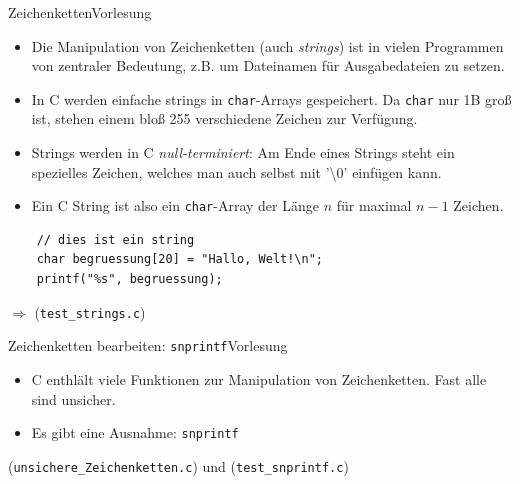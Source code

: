 \documentclass[xcolor=dvipsnames]{beamer}
\newcounter{lecturecounter}
\begin{document}
\begin{frame}[fragile]{Zeichenketten}{Vorlesung }
  \begin{block}{}
    \begin{itemize}
      \item{Die Manipulation von Zeichenketten (auch \emph{strings}) ist in vielen Programmen von zentraler Bedeutung, z.B. um Dateinamen für Ausgabedateien zu setzen.}
      \item{In C werden einfache strings in \texttt{char}-Arrays gespeichert. Da \texttt{char} nur 1B groß ist, stehen einem bloß 255 verschiedene Zeichen zur Verfügung.}
      \item{Strings werden in C \emph{null-terminiert}: Am Ende eines Strings steht ein spezielles Zeichen, welches man auch selbst mit '\textbackslash 0' einfügen kann.}
      \item{Ein C String ist also ein \texttt{char}-Array der Länge $n$ für maximal $n-1$ Zeichen.}
    \end{itemize}
  \end{block}
  \begin{lstlisting}
    // dies ist ein string
    char begruessung[20] = "Hallo, Welt!\n";
    printf("%s", begruessung);
  \end{lstlisting}
  $\Rightarrow$ (\verb|test_strings.c|)
\end{frame}

\begin{frame}[fragile]{Zeichenketten bearbeiten: \texttt{snprintf}}{Vorlesung }
  \begin{block}{}
    \begin{itemize}
      \item{C enthlält viele Funktionen zur Manipulation von Zeichenketten. Fast alle sind unsicher.}
      \item{Es gibt eine Ausnahme: \texttt{snprintf}}
    \end{itemize}
  \end{block}
  (\verb|unsichere_Zeichenketten.c|)  und (\verb|test_snprintf.c|)
\end{frame}
\end{document}
